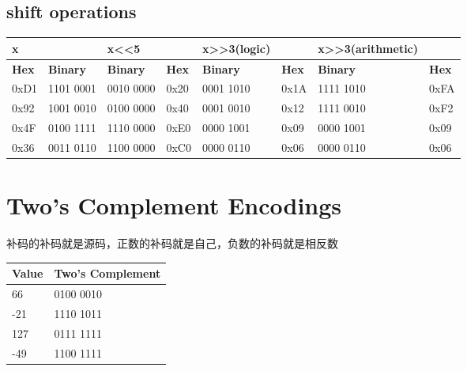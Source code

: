 \documentclass[12pt, a4paper, oneside]{ctexart}
\begin{document}
\subsection{shift operations}
\begin{table}[h]
    \centering
    \begin{tabular}{|l|l|l|l|l|l|l|l|}
    \hline
    x            & \textbf{}       & x\textless{}\textless{}5 & \textbf{}    & x\textgreater{}\textgreater{}3(logic) &              & x\textgreater{}\textgreater{}3(arithmetic) &              \\ \hline
    \textbf{Hex} & \textbf{Binary} & \textbf{Binary}          & \textbf{Hex} & \textbf{Binary}                       & \textbf{Hex} & \textbf{Binary}                            & \textbf{Hex} \\ \hline
    0xD1         & 1101 0001       & 0010 0000                & 0x20         & 0001 1010                             & 0x1A         & 1111 1010                                  & 0xFA             \\ \hline
    0x92         & 1001 0010       & 0100 0000                & 0x40         & 0001 0010                             & 0x12         & 1111 0010                                  & 0xF2             \\ \hline
    0x4F         & 0100 1111       & 1110 0000                & 0xE0         & 0000 1001                             & 0x09         & 0000 1001                                  & 0x09             \\ \hline
    0x36         & 0011 0110       & 1100 0000                & 0xC0         & 0000 0110                             & 0x06         & 0000 0110                                  & 0x06             \\ \hline
    \end{tabular}
\end{table}

\section{Two's Complement Encodings}
补码的补码就是源码，正数的补码就是自己，负数的补码就是相反数
\begin{table}[]
    \centering
    \begin{tabular}{|l|l|}
    \hline
    \textbf{Value} & \textbf{Two's Complement} \\ \hline
    66             & 0100 0010                      \\ \hline
    -21            & 1110 1011                          \\ \hline
    127            & 0111 1111                          \\ \hline
    -49            & 1100 1111                          \\ \hline
    \end{tabular}
\end{table}
\end{document}
